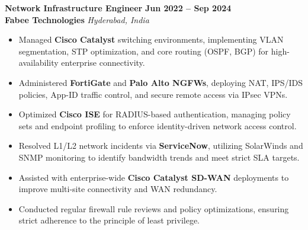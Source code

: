 \documentclass[10pt,a4paper]{article}
\newcommand{\jobheading}[4]{
  \vspace{1.5ex}\noindent
  {\large\textbf{\color{darkteal}#1}} \hfill \textbf{\color{textmain}#2} \\[0.3ex]
  \textbf{\color{textdark}#3} \hfill \textit{\color{textmain}#4} \vspace{0.8ex}
}
\begin{document}
\jobheading{Network Infrastructure Engineer}{Jun 2022 -- Sep 2024}{Fabee Technologies}{Hyderabad, India}
\begin{itemize}[label={\color{teal}\textbullet},leftmargin=*,itemsep=3pt,parsep=1pt,topsep=1pt]
    \item Managed \textbf{Cisco Catalyst} switching environments, implementing VLAN segmentation, STP optimization, and core routing (OSPF, BGP) for high-availability enterprise connectivity.
    \item Administered \textbf{FortiGate} and \textbf{Palo Alto NGFWs}, deploying NAT, IPS/IDS policies, App-ID traffic control, and secure remote access via IPsec VPNs.
    \item Optimized \textbf{Cisco ISE} for RADIUS-based authentication, managing policy sets and endpoint profiling to enforce identity-driven network access control.
    \item Resolved L1/L2 network incidents via \textbf{ServiceNow}, utilizing SolarWinds and SNMP monitoring to identify bandwidth trends and meet strict SLA targets.
    \item Assisted with enterprise-wide \textbf{Cisco Catalyst SD-WAN} deployments to improve multi-site connectivity and WAN redundancy.
    \item Conducted regular firewall rule reviews and policy optimizations, ensuring strict adherence to the principle of least privilege.
\end{itemize}
\end{document}
